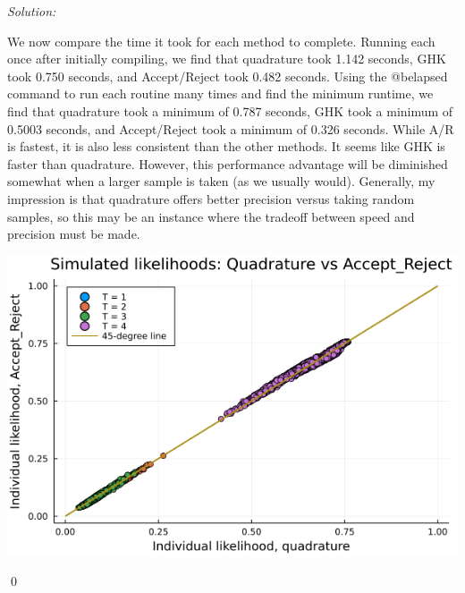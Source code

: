\documentclass[12pt]{article}
\newenvironment{problem}[2][Problem]{\begin{trivlist}
\item[\hskip \labelsep {\bfseries #1}\hskip \labelsep {\bfseries #2.}]}{\end{trivlist}}
\newenvironment{sol}
    {\emph{Solution:}
    }
    {
    \qed
    }
\begin{document}
\begin{sol}
We now compare the time it took for each method to complete. Running each once after initially compiling, we find that quadrature took 1.142 seconds, GHK took 0.750 seconds, and Accept/Reject took 0.482 seconds. Using the @belapsed command to run each routine many times and find the minimum runtime, we find that quadrature took a minimum of 0.787 seconds, GHK took a minimum of 0.5003 seconds, and Accept/Reject took a minimum of 0.326 seconds. While A/R is fastest, it is also less consistent than the other methods. It seems like GHK is faster than quadrature. However, this performance advantage will be diminished somewhat when a larger sample is taken (as we usually would). Generally, my impression is that quadrature offers better precision versus taking random samples, so this may be an instance where the tradeoff between speed and precision must be made. 
    \begin{center}
        \includegraphics[scale=0.5]{Accept_Reject_comp.png}
    \end{center}
\end{sol}
\begin{problem}{5}
\end{problem}
\end{document}
